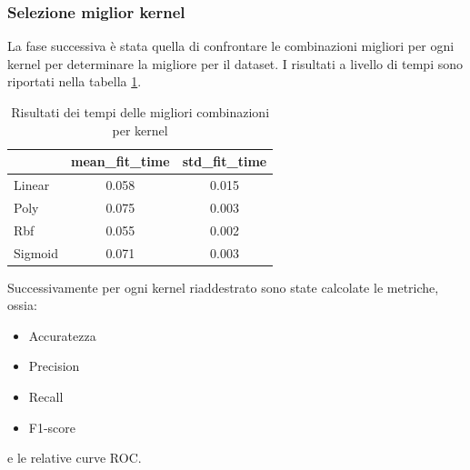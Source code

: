 \subsubsection{Selezione miglior kernel}
La fase successiva è stata quella di confrontare le combinazioni migliori per ogni 
kernel per determinare la migliore per il dataset. I risultati a livello di tempi sono
riportati nella tabella \ref{tab:top_time_kernels_corr}.
\begin{table}[!ht]
    \centering
    \begin{tabular}{@{}lcc@{}}
        \toprule
        \rowcolor[HTML]{EFEFEF}
        \multicolumn{1}{c}{\cellcolor[HTML]{EFEFEF}\textbf{kernel}} & \textbf{mean\_fit\_time} & \textbf{std\_fit\_time} \\ \midrule
        Linear                                                      & 0.058                    & 0.015                   \\
        Poly                                                        & 0.075                    & 0.003                   \\
        Rbf                                                         & 0.055                    & 0.002                   \\
        Sigmoid                                                     & 0.071                    & 0.003                   \\ \bottomrule
    \end{tabular}
    \caption{Risultati dei tempi delle migliori combinazioni per kernel}
    \label{tab:top_time_kernels_corr}
\end{table}

Successivamente per ogni kernel riaddestrato sono state calcolate
le metriche, ossia:
\begin{itemize}
    \item Accuratezza
    \item Precision
    \item Recall
    \item F1-score
\end{itemize}
e le relative curve ROC.

